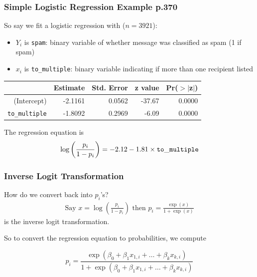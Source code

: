 \documentclass[handout]{beamer}
\newcommand{\blue}[1]{\textcolor{blue2}{#1}}
\begin{document}
\begin{frame}[fragile]
\frametitle{Simple Logistic Regression Example p.370}

So say we fit a logistic regression with ($n=3921$):
\begin{itemize}
\item $Y_i$ is {\tt spam}:  binary variable of whether message was classified as spam (1 if spam)
\item $x_i$ is {\tt to\_multiple}:  binary variable indicating if more than one recipient listed
\end{itemize}
\pause
\begin{table}[ht]
\centering
\begin{tabular}{r|rrrr}
  \hline
 & Estimate & Std. Error & z value & Pr($>$$|$z$|$) \\ 
  \hline
(Intercept) & -2.1161 & 0.0562 & -37.67 & 0.0000 \\ 
  {\tt to\_multiple} & -1.8092 & 0.2969 & -6.09 & 0.0000 \\ 
   \hline
\end{tabular}
\end{table}

%
%
The regression equation is
\[
\log\left(\frac{p_i}{1-p_i}\right) = -2.12 - 1.81 \times {\tt to\_multiple} 
\]

\end{frame}


\begin{frame}[fragile]
\frametitle{Inverse Logit Transformation}
%
%
How do we convert back into $p_i$'s?
\pause
\begin{eqnarray*}
\mbox{Say } x = \log\left(\frac{p_i}{1-p_i}\right) \mbox{ then } p_i = \frac{\exp(x)}{1 + \exp(x)}
\end{eqnarray*}
is the \blue{inverse logit transformation}.

\vspace{0.5cm}
\pause
So to convert the regression equation to probabilities, we compute

\[
p_i = \frac{\exp(\beta_0 + \beta_1 x_{1,i} + \ldots + \beta_k x_{k,i})}{1 + \exp(\beta_0 + \beta_1 x_{1,i} + \ldots + \beta_k x_{k,i})}
\]
\end{frame}
\end{document}
